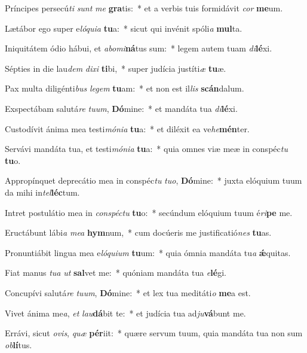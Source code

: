 \item Príncipes persecú\textit{ti} \textit{sunt} \textit{me} \textbf{gra}tis:~* et a verbis tuis formidávit \textit{cor} \textbf{me}um.
\item Lætábor ego super e\textit{ló}\textit{qui}\textit{a} \textbf{tu}a:~* sicut qui invénit spóli\textit{a} \textbf{mul}ta.
\item Iniquitátem ódio hábui, et \textit{ab}\textit{o}\textit{mi}\textbf{ná}tus sum:~* legem autem tuam \textit{di}\textbf{lé}xi.
\item Sépties in die lau\textit{dem} \textit{di}\textit{xi} \textbf{ti}bi,~* super judícia justíti\textit{æ} \textbf{tu}æ.
\item Pax multa diligénti\textit{bus} \textit{le}\textit{gem} \textbf{tu}am:~* et non est il\textit{lis} \textbf{scán}dalum.
\item Exspectábam salutá\textit{re} \textit{tu}\textit{um}, \textbf{Dó}mine:~* et mandáta tua \textit{di}\textbf{lé}xi.
\item Custodívit ánima mea testi\textit{mó}\textit{ni}\textit{a} \textbf{tu}a:~* et diléxit ea ve\textit{he}\textbf{mén}ter.
\item Servávi mandáta tua, et testi\textit{mó}\textit{ni}\textit{a} \textbf{tu}a:~* quia omnes viæ meæ in conspéc\textit{tu} \textbf{tu}o.
\item Appropínquet deprecátio mea in conspéc\textit{tu} \textit{tu}\textit{o}, \textbf{Dó}mine:~* juxta elóquium tuum da mihi in\textit{tel}\textbf{léc}tum.
\item Intret postulátio mea in \textit{con}\textit{spéc}\textit{tu} \textbf{tu}o:~* secúndum elóquium tuum é\textit{ri}\textbf{pe} me.
\item Eructábunt lábi\textit{a} \textit{me}\textit{a} \textbf{hym}num,~* cum docúeris me justificatió\textit{nes} \textbf{tu}as.
\item Pronuntiábit lingua mea e\textit{ló}\textit{qui}\textit{um} \textbf{tu}um:~* quia ómnia mandáta tu\textit{a} \textbf{ǽ}quitas.
\item Fiat manus \textit{tu}\textit{a} \textit{ut} \textbf{sal}vet me:~* quóniam mandáta tua \textit{e}\textbf{lé}gi.
\item Concupívi salutá\textit{re} \textit{tu}\textit{um}, \textbf{Dó}mine:~* et lex tua meditáti\textit{o} \textbf{me}a est.
\item Vivet ánima me\textit{a}, \textit{et} \textit{lau}\textbf{dá}bit te:~* et judícia tua ad\textit{ju}\textbf{vá}bunt me.
\item Errávi, sicut \textit{o}\textit{vis}, \textit{quæ} \textbf{pér}iit:~* quære servum tuum, quia mandáta tua non sum \textit{ob}\textbf{lí}tus.
